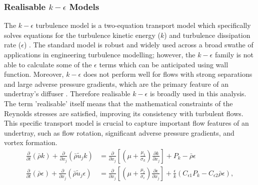 \subsubsection{Realisable $k-\epsilon$ Models}
The $k-\epsilon$ turbulence model is a two-equation transport model which specifically solves equations for the turbulence kinetic energy ($k$) and turbulence dissipation rate ($\epsilon$) \cite{Andersson2011Turbulent-flowModelling}\cite{Mansour1989Near-wallModeling}\cite{Ansys2006ModelingFlows}. The standard model is robust and widely used across a broad swathe of applications in engineering turbulence modelling; however, the $k-\epsilon$ family is not able to calculate some of the $\epsilon$ terms which can be anticipated using wall function. Moreover, $k-\epsilon$ does not perform well for flows with strong separations and large adverse pressure gradients, which are the primary feature of an undertray's diffuser \cite{Ansys2006ModelingFlows}.  Therefore realisable $k-\epsilon$ is broadly used in this analysis. The term 'realisable' itself means that the mathematical constraints of the Reynolds stresses are satisfied, improving its consistency  with turbulent flows. This specific transport model is crucial to capture important flow features of an undertray, such as flow rotation, significant adverse pressure gradients, and vortex formation.
\begin{align}
\frac{\partial}{\partial t}(\bar{\rho} k)+\frac{\partial}{\partial x_j}(\bar{\rho} \tilde{u}_j k) & = \frac{\partial}{\partial x_j} \left[ \left(\mu + \frac{\mu_t}{\sigma_k}\right) \frac{\partial k}{\partial x_j} \right] +P_k-\bar{\rho}\epsilon \\ 
\frac{\partial }{\partial t}(\bar{\rho} \epsilon)+\frac{\partial}{\partial x_j}(\bar{\rho} \tilde{u}_j \epsilon) & = \frac{\partial}{\partial x_j} \left[ \left(\mu + \frac{\mu_t}{\sigma_{\epsilon}}\right) \frac{\partial \epsilon}{\partial x_j} \right] + \frac{\epsilon}{k}(C_{\epsilon 1}P_k-C_{\epsilon 2}\bar{\rho} \epsilon),
\end{align} 

